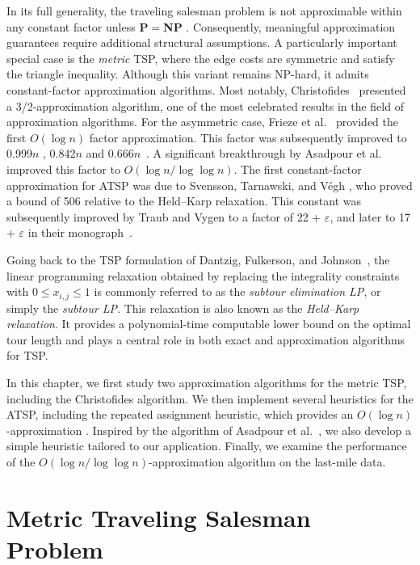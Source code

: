 \documentclass[12pt]{report}
\theoremstyle{definition}
\begin{document}
In its full generality, the traveling salesman problem is not approximable within any constant factor unless \textbf{\textsc{P}}$=$\textbf{\textsc{NP}} \cite[Theorem~3.6]{vazirani}. Consequently, meaningful approximation guarantees require additional structural assumptions. A particularly important special case is the \emph{metric} TSP, where the edge costs are symmetric and satisfy the triangle  inequality. Although this variant remains NP-hard, it admits constant-factor approximation algorithms. Most notably, Christofides~\cite{christofides1976} presented a 3/2-approximation algorithm, one of the most celebrated results in the field of approximation algorithms. For the asymmetric case, Frieze et al.~\cite{frieze1982} provided the first $O(\log n)$ factor approximation. This factor was subsequently improved to 0.999$n$ \cite{blaser2002}, 0.842$n$ \cite{Kaplan_decomposing} and 0.666$ n$~\cite{Singh_improved}. A significant breakthrough by Asadpour et al.~\cite{asadpour} improved this factor to $O(\log n / \log \log n)$. The first constant-factor approximation for ATSP was due to Svensson, Tarnawski, and V{\'e}gh \cite{svensson2018}, who proved a bound of 506 relative to the Held--Karp relaxation. This constant was subsequently improved by Traub and Vygen \cite{traub2020} to a factor of 22 + $\varepsilon$, and later to 17 + $\varepsilon$ in their monograph~\cite{traub}.

Going back to the TSP formulation of Dantzig, Fulkerson, and Johnson~\cite{dfj1954}, the linear programming relaxation obtained by replacing the integrality 
constraints with $0 \leq x_{i,j} \leq 1$ is commonly referred to as the \emph{subtour elimination LP}, or simply the \emph{subtour LP}. This relaxation is also known as the \emph{Held--Karp relaxation}. It provides a polynomial-time computable lower bound on the optimal tour length and plays a central role in both exact and approximation 
algorithms for TSP.

In this chapter, we first study two approximation algorithms for the metric TSP, including the Christofides algorithm. We then implement several heuristics for the ATSP, including the repeated assignment heuristic, which provides an $O(\log n)$-approximation \cite{frieze1982}. Inspired by the algorithm of Asadpour et al.~\cite{asadpour}, we also develop a simple heuristic tailored to our application. Finally, we examine the performance of the $O(\log n / \log \log n)$-approximation algorithm on the last-mile data.

\section{Metric Traveling Salesman Problem}
\end{document}
